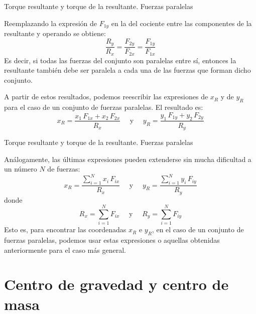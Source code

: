 \documentclass[11pt,handout,aspectratio=1610]{beamer}
\newcommand{\vs}{\vspace{11pt}}
\begin{document}
\begin{frame}{Torque resultante y torque de la resultante. Fuerzas paralelas}

    Reemplazando la expresión de $F_{1y}$ en la del cociente entre las componentes de la resultante y operando se obtiene: $$ \frac{R_y}{R_x} = \frac{F_{2y}}{F_{2x}} = \frac{F_{1y}}{F_{1x}} $$ Es decir, si todas las fuerzas del conjunto son paralelas entre sí, entonces la resultante también debe ser paralela a cada una de las fuerzas que forman dicho conjunto.

    \vs 

    A partir de estos resultados, podemos reescribir las expresiones de $x_R$ y de $y_R$ para el caso de un conjunto de fuerzas paralelas. El resultado es: $$ x_R = \frac{x_1 \, F_{1x} + x_2 \, F_{2x}}{R_x} \quad \text{ y } \quad y_R = \frac{y_1 \, F_{1y} + y_2 \, F_{2y}}{R_y} $$
    
\end{frame}

\begin{frame}{Torque resultante y torque de la resultante. Fuerzas paralelas}

    Análogamente, las últimas expresiones pueden extenderse sin mucha dificultad a un número $N$ de fuerzas: $$ x_R = \frac{\sum\limits_{i=1}^{N} x_i \, F_{ix}}{R_x} \quad \text{ y } \quad y_R = \frac{\sum\limits_{i=1}^{N} y_i \, F_{iy}}{R_y} $$ donde $$ R_x = \sum_{i=1}^{N} F_{ix} \quad \text{ y } \quad R_y = \sum_{i=1}^{N} F_{iy} $$ Esto es, para encontrar las coordenadas $x_R$ e $y_R$, en el caso de un conjunto de fuerzas paralelas, podemos usar estas expresiones o aquellas obtenidas anteriormente para el caso más general.
    
\end{frame}

\section{Centro de gravedad y centro de masa}
\end{document}
